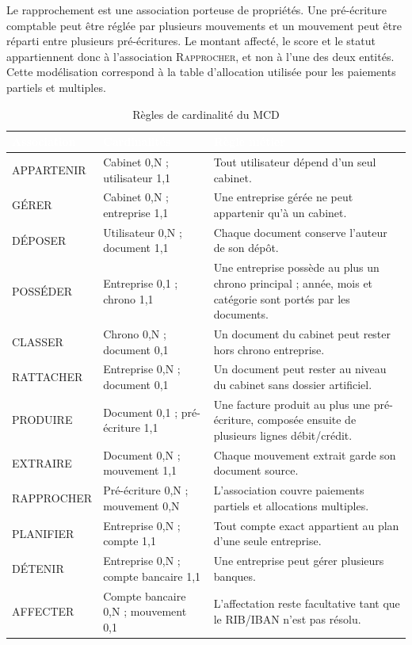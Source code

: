 \documentclass[12pt,a4paper,oneside]{report}
\newcommand{\TableSetup}{%
  \arrayrulecolor{ComptaTableLine}%
  \setlength{\arrayrulewidth}{0.45pt}%
  \renewcommand{\arraystretch}{1.18}%
}
\newcommand{\TableHead}[1]{\textcolor{white}{\textbf{#1}}}
\begin{document}
Le rapprochement est une association porteuse de propriétés. Une pré-écriture comptable peut être réglée par plusieurs mouvements et un mouvement peut être réparti entre plusieurs pré-écritures. Le montant affecté, le score et le statut appartiennent donc à l'association \textsc{Rapprocher}, et non à l'une des deux entités. Cette modélisation correspond à la table d'allocation utilisée pour les paiements partiels et multiples.

\begin{table}[H]
\centering
\caption{Règles de cardinalité du MCD}
\TableSetup
\begin{tabularx}{\textwidth}{|L{3.5cm}|L{3cm}|Y|}
\toprule
{}\TableHead{Association} & \TableHead{Cardinalités} & \TableHead{Règle métier} \\
\midrule
APPARTENIR & Cabinet 0,N ; utilisateur 1,1 & Tout utilisateur dépend d'un seul cabinet. \\
GÉRER & Cabinet 0,N ; entreprise 1,1 & Une entreprise gérée ne peut appartenir qu'à un cabinet. \\
DÉPOSER & Utilisateur 0,N ; document 1,1 & Chaque document conserve l'auteur de son dépôt. \\
POSSÉDER & Entreprise 0,1 ; chrono 1,1 & Une entreprise possède au plus un chrono principal ; année, mois et catégorie sont portés par les documents. \\
CLASSER & Chrono 0,N ; document 0,1 & Un document du cabinet peut rester hors chrono entreprise. \\
RATTACHER & Entreprise 0,N ; document 0,1 & Un document peut rester au niveau du cabinet sans dossier artificiel. \\
PRODUIRE & Document 0,1 ; pré-écriture 1,1 & Une facture produit au plus une pré-écriture, composée ensuite de plusieurs lignes débit/crédit. \\
EXTRAIRE & Document 0,N ; mouvement 1,1 & Chaque mouvement extrait garde son document source. \\
RAPPROCHER & Pré-écriture 0,N ; mouvement 0,N & L'association couvre paiements partiels et allocations multiples. \\
PLANIFIER & Entreprise 0,N ; compte 1,1 & Tout compte exact appartient au plan d'une seule entreprise. \\
DÉTENIR & Entreprise 0,N ; compte bancaire 1,1 & Une entreprise peut gérer plusieurs banques. \\
AFFECTER & Compte bancaire 0,N ; mouvement 0,1 & L'affectation reste facultative tant que le RIB/IBAN n'est pas résolu. \\
\bottomrule
\end{tabularx}
\end{table}
\end{document}
